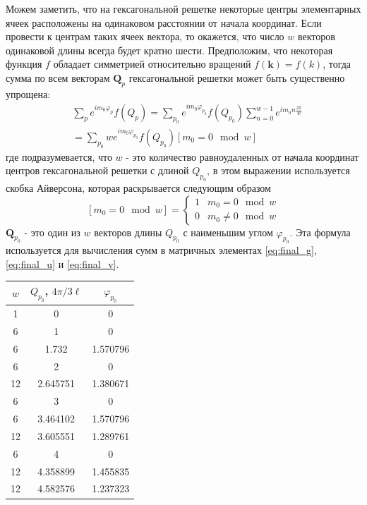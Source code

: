 \documentclass[a4paper,article,14pt]{extarticle}
\begin{document}
Можем заметить, что на гексагональной решетке некоторые центры элементарных ячеек расположены на одинаковом расстоянии от начала координат. Если провести к центрам таких ячеек вектора, то окажется, что число $w$ векторов одинаковой длины всегда будет кратно шести. Предположим, что некоторая функция $f$ обладает симметрией относительно вращений $f(\mathbf{k})=f(k)$, тогда сумма по всем векторам $\mathbf{Q}_p$ гексагональной решетки может быть существенно упрощена:
\begin{equation}
\label{eq:sum_qp}
\begin{aligned}
&\sum\limits_{p} e^{i m_0\varphi_p}   f(Q_p)  = \sum\limits_{p_0} e^{im_0\varphi_{{p_0}}} f(Q_{p_0})   \sum\limits_{n=0}^{w-1} e^{i m_0 n \frac{2 \pi}{w}} \\
  &=\sum\limits_{p_0} w e^{i m_0\varphi_{p_0}} f(Q_{p_0}) \left[m_0 = 0 \mod w  \right] 
\end{aligned}
\end{equation}
где подразумевается, что $w$ - это количество равноудаленных от начала координат центров гексагональной решетки с длиной $Q_{p_0}$, в этом выражении используется скобка Айверсона, которая раскрывается следующим образом
$$
\left[m_0 = 0 \mod w  \right] =   
\begin{cases}
   1 & m_0 = 0 \mod w \\
   0 & m_0 \neq 0 \mod w 
 \end{cases}
$$
$\mathbf{Q}_{p_0}$ - это один из $w$ векторов длины $Q_{p_0}$ с наименьшим углом $\varphi_{p_0}$.
Эта формула используется для вычисления сумм в матричных элементах \eqref{eq:final_g}, \eqref{eq:final_u} и \eqref{eq:final_v}.

\begin{center}
\begin{tabular}{ |c|c|c| }
 \hline
 $w$  & $Q_{p_0}$, $4 \pi / 3 \ell$ & $\varphi_{p_0}$\\ 
 \hline
 1&0&0\\
 6&1&0\\
 6&1.732&1.570796\\
 6&2&0\\
 12&2.645751&1.380671\\
 6&3&0\\
 6&3.464102&1.570796\\
 12&3.605551&1.289761\\
 6&4&0\\
 12&4.358899&1.455835\\
 12&4.582576&1.237323\\
 \hline
\end{tabular}
\end{center}
\end{document}
